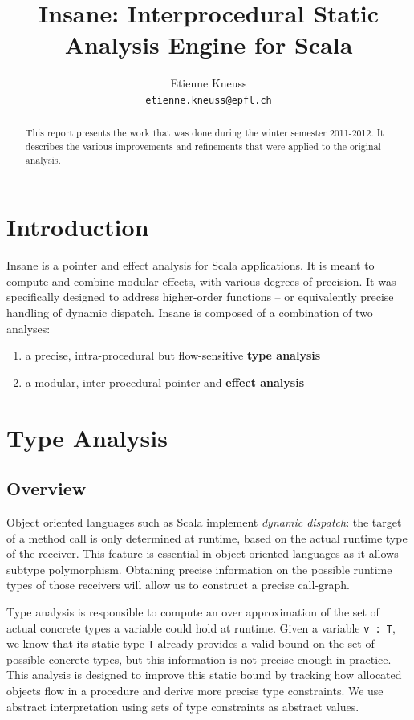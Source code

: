 \documentclass[a4paper]{article}
\author{Etienne Kneuss\\
\texttt{etienne.kneuss@epfl.ch}
}
\title{Insane: Interprocedural Static Analysis Engine for Scala}
\begin{document}
\maketitle
\begin{abstract}
  This report presents the work that was done during the winter semester
  2011-2012. It describes the various improvements and refinements that
  were applied to the original analysis.
\end{abstract}
\section{Introduction}
Insane is a pointer and effect analysis for Scala applications. It is meant to
compute and combine modular effects, with various degrees of precision. It was
specifically designed to address higher-order functions -- or equivalently
precise handling of dynamic dispatch. Insane is composed of a combination of
two analyses:

\begin{enumerate}
    \item a precise, intra-procedural but flow-sensitive \textbf{type analysis}
    \item a modular, inter-procedural pointer and \textbf{effect analysis}
\end{enumerate}

\section{Type Analysis}
\subsection{Overview}
Object oriented languages such as Scala implement \emph{dynamic dispatch}: the
target of a method call is only determined at runtime, based on the actual
runtime type of the receiver. This feature is essential in object oriented
languages as it allows subtype polymorphism. Obtaining precise information on
the possible runtime types of those receivers will allow us to construct a
precise call-graph.

Type analysis is responsible to compute an over approximation of the set of
actual concrete types a variable could hold at runtime. Given a variable
\verb=v : T=, we know that its static type \verb=T= already provides a valid
bound on the set of possible concrete types, but this information is not
precise enough in practice. This analysis is designed to improve this static
bound by tracking how allocated objects flow in a procedure and derive more
precise type constraints. We use abstract interpretation using sets of type
constraints as abstract values.
\end{document}
